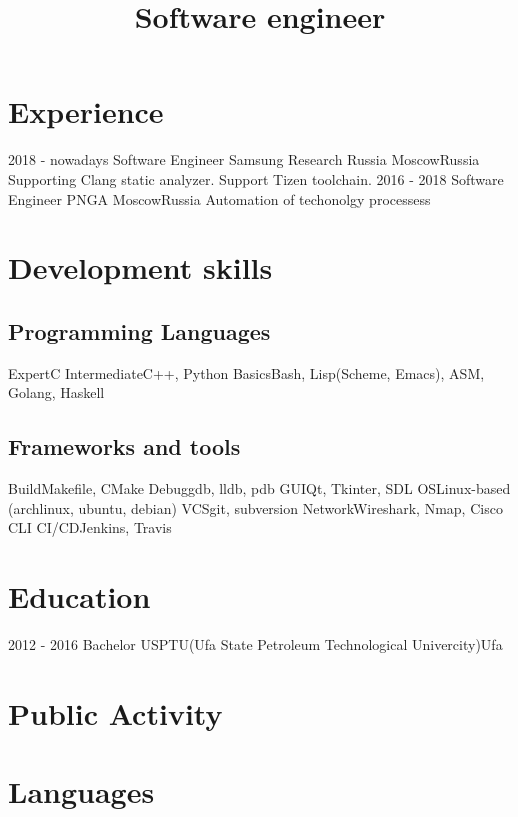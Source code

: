 \documentclass[11pt,a4paper]{moderncv}
\title{Software engineer}
\begin{document}
\makecvtitle

\section{\textbf{Experience}}
\cventry
    {2018 - nowadays}
    {Software Engineer}
    {Samsung Research Russia}
    {Moscow}{Russia}
    {Supporting Clang static analyzer. Support Tizen toolchain.}
\cventry
    {2016 - 2018}
    {Software Engineer}
    {PNGA}
    {Moscow}{Russia}
    {Automation of techonolgy processess}

\section{\textbf{Development skills}}
\subsection{\textbf{Programming Languages}}
\cvitem
    {Expert}{C}
\cvitem
    {Intermediate}{C++, Python}
\cvitem
    {Basics}{Bash, Lisp(Scheme, Emacs), ASM, Golang, Haskell}
    
\subsection{\textbf{Frameworks and tools}}
\cvitem
    {Build}{Makefile, CMake}
\cvitem
    {Debug}{gdb, lldb, pdb}
\cvitem
    {GUI}{Qt, Tkinter, SDL}
\cvitem
    {OS}{Linux-based (archlinux, ubuntu, debian)}
\cvitem
    {VCS}{git, subversion}
\cvitem
    {Network}{Wireshark, Nmap, Cisco CLI}
\cvitem
    {CI/CD}{Jenkins, Travis}
    
\section{\textbf{Education}}
\cventry
    {2012 - 2016}
    {Bachelor}
    {USPTU(Ufa State Petroleum Technological Univercity)}{Ufa}{}{}

\section{\textbf{Public Activity}}

\section{\textbf{Languages}}
\end{document}
